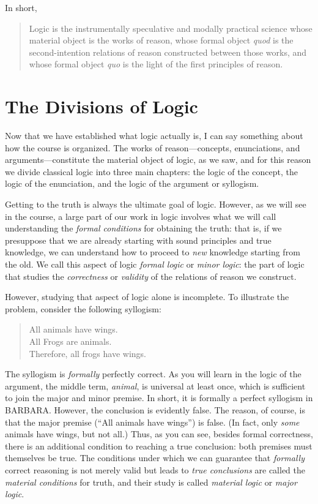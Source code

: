 \documentclass[
  12pt,
]{memoir}
\begin{document}
In short,

\begin{quote}
Logic is the instrumentally speculative and modally practical science
whose material object is the works of reason, whose formal object
\emph{quod} is the second-intention relations of reason constructed
between those works, and whose formal object \emph{quo} is the light of
the first principles of reason.
\end{quote}

\section{The Divisions of Logic}\label{the-divisions-of-logic}

Now that we have established what logic actually is, I can say something
about how the course is organized. The works of reason---concepts,
enunciations, and arguments---constitute the material object of logic,
as we saw, and for this reason we divide classical logic into three main
chapters: the logic of the concept, the logic of the enunciation, and
the logic of the argument or syllogism.

Getting to the truth is always the ultimate goal of logic. However, as
we will see in the course, a large part of our work in logic involves
what we will call understanding the \emph{formal conditions} for
obtaining the truth: that is, if we presuppose that we are already
starting with sound principles and true knowledge, we can understand how
to proceed to \emph{new} knowledge starting from the old. We call this
aspect of logic \emph{formal logic} or \emph{minor logic}: the part of
logic that studies the \emph{correctness} or \emph{validity} of the
relations of reason we construct.

However, studying that aspect of logic alone is incomplete. To
illustrate the problem, consider the following syllogism:

\begin{quote}
All animals have wings.\\
All Frogs are animals.\\
Therefore, all frogs have wings.
\end{quote}

\noindent The syllogism is \emph{formally} perfectly correct. As you
will learn in the logic of the argument, the middle term, \emph{animal},
is universal at least once, which is sufficient to join the major and
minor premise. In short, it is formally a perfect syllogism in BARBARA.
However, the conclusion is evidently false. The reason, of course, is
that the major premise (``All animals have wings'') is false. (In fact,
only \emph{some} animals have wings, but not all.) Thus, as you can see,
besides formal correctness, there is an additional condition to reaching
a true conclusion: both premises must themselves be true. The conditions
under which we can guarantee that \emph{formally} correct reasoning is
not merely valid but leads to \emph{true conclusions} are called the
\emph{material conditions} for truth, and their study is called
\emph{material logic} or \emph{major logic}.
\end{document}
